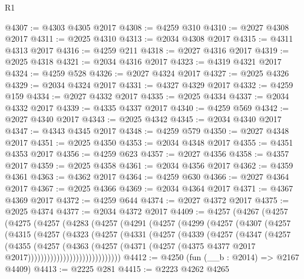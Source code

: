 \begin{lexlean}{R1}
\begin{coremodule}
@4307 := @4303 @4305 @2017
@4308 := @4259 @310
@4310 := @2027 @4308 @2017
@4311 := @2025 @4310
@4313 := @2034 @4308 @2017
@4315 := @4311 @4313 @2017
@4316 := @4259 @211
@4318 := @2027 @4316 @2017
@4319 := @2025 @4318
@4321 := @2034 @4316 @2017
@4323 := @4319 @4321 @2017
@4324 := @4259 @528
@4326 := @2027 @4324 @2017
@4327 := @2025 @4326
@4329 := @2034 @4324 @2017
@4331 := @4327 @4329 @2017
@4332 := @4259 @159
@4334 := @2027 @4332 @2017
@4335 := @2025 @4334
@4337 := @2034 @4332 @2017
@4339 := @4335 @4337 @2017
@4340 := @4259 @569
@4342 := @2027 @4340 @2017
@4343 := @2025 @4342
@4345 := @2034 @4340 @2017
@4347 := @4343 @4345 @2017
@4348 := @4259 @579
@4350 := @2027 @4348 @2017
@4351 := @2025 @4350
@4353 := @2034 @4348 @2017
@4355 := @4351 @4353 @2017
@4356 := @4259 @623
@4357 := @2027 @4356
@4358 := @4357 @2017
@4359 := @2025 @4358
@4361 := @2034 @4356 @2017
@4362 := @4359 @4361
@4363 := @4362 @2017
@4364 := @4259 @630
@4366 := @2027 @4364 @2017
@4367 := @2025 @4366
@4369 := @2034 @4364 @2017
@4371 := @4367 @4369 @2017
@4372 := @4259 @644
@4374 := @2027 @4372 @2017
@4375 := @2025 @4374
@4377 := @2034 @4372 @2017
@4409 := @4257
    (@4267
      (@4257
        (@4275
          (@4257
            (@4283
              (@4257
                (@4291
                  (@4257
                    (@4299
                      (@4257
                        (@4307
                          (@4257
                            (@4315
                              (@4257
                                (@4323
                                  (@4257
                                    (@4331
                                      (@4257
                                        (@4339
                                          (@4257
                                            (@4347
                                              (@4257
                                                (@4355
                                                  (@4257
                                                    (@4363
                                                      (@4257
                                                        (@4371
                                                          (@4257
                                                            (@4375
                                                              @4377
                                                              @2017
                                                              @2017)))))))))))))))))))))))))))))
@4412 := @4250 (fun (__b : @2014) => @2167 @4409)
@4413 := @2225 @281
@4415 := @2223 @4262 @4265

\end{coremodule}
\end{lexlean}
